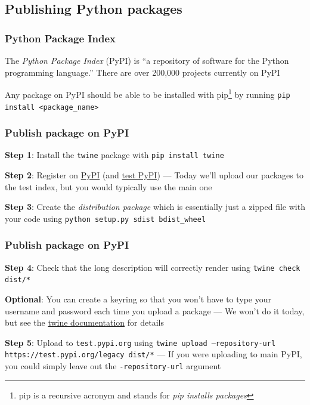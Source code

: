 \documentclass[10pt]{beamer}
\begin{document}
  \subsection{Publishing Python packages}

  \begin{frame} \frametitle{Python Package Index}

    The \textit{Python Package Index} (PyPI) is ``a repository of software for the Python programming
    language.'' There are over 200,000 projects currently on PyPI

    \vspace{0.3cm}

    Any package on PyPI should be able to be installed with pip\footnote{pip is a recursive
    acronym and stands for \textit{pip installs packages}} by running
    \texttt{pip install <package\_name>}

  \end{frame}

  \begin{frame} \frametitle{Publish package on PyPI}

    \textbf{Step 1}: Install the \texttt{twine} package with \texttt{pip install twine}

    \vspace{0.25cm}

    \textbf{Step 2}: Register on \href{https://pypi.org/account/register/}{PyPI} (and
    \href{https://test.pypi.org/account/register/}{test PyPI}) --- Today we'll upload our
    packages to the test index, but you would typically use the main one

    \vspace{0.25cm}

    \textbf{Step 3}: Create the \textit{distribution package} which is essentially just
    a zipped file with your code using \texttt{python setup.py sdist bdist\_wheel}

  \end{frame}

  \begin{frame} \frametitle{Publish package on PyPI}

    \textbf{Step 4}: Check that the long description will correctly render using
    \texttt{twine check dist/*}

    \vspace{0.25cm}

    \textbf{Optional}: You can create a keyring so that you won't have to type your
    username and password each time you upload a package --- We won't do it today, but
    see the \href{https://github.com/pypa/twine\#keyring-support}{twine documentation}
    for details

    \vspace{0.25cm}

    \textbf{Step 5}: Upload to \texttt{test.pypi.org} using
    \texttt{twine upload --repository-url https://test.pypi.org/legacy dist/*} --- If
    you were uploading to main PyPI, you could simply leave out the
    \texttt{-repository-url} argument

  \end{frame}
\end{document}
